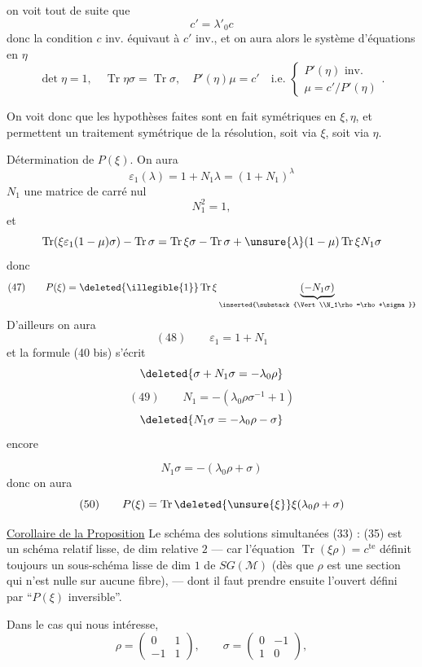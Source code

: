 
on voit tout de suite que
\[
c'=\lambda'_0c
\]
donc la condition $c$ inv. équivaut à $c'$ inv.,
et on aura alors le système d'équations en $\eta$
\[
\det\eta=1,\quad
\operatorname{Tr}\eta\sigma=\operatorname{Tr}\sigma,\quad
P'(\eta)\mu=c'\quad\text{i.e. }
\left\{
\begin{gathered}
P'(\eta)\text{ inv.}\\
\mu=c'/P'(\eta)
\end{gathered}
\right.
.
\]

On voit donc que les hypothèses faites sont en fait symétriques en
$\xi,\eta$, et permettent un traitement symétrique de la résolution,
soit via $\xi$, soit via $\eta$.

Détermination de $P(\xi)$. On aura
\[
\varepsilon_1(\lambda)=1+N_1\lambda=(1+N_1)^\lambda
\]
$N_1$ une matrice de carré nul
\[
N_1^2=1,
\]
et
\[
\operatorname{Tr}(\xi\varepsilon_1(1-\mu)\sigma)-\operatorname{Tr}\sigma
=\operatorname{Tr}\xi\sigma-\operatorname{Tr}\sigma
+\unsure{\lambda}(1-\mu)\operatorname{Tr}\xi N_1\sigma
\]
donc
\[
(47)\qquad
P(\xi)=\deleted{\illegible{1}}\operatorname{Tr}\xi
\underbrace{(-N_1\sigma)}_{\inserted{\substack{\Vert\\N_1\rho=\rho+\sigma}}}
\]
D'ailleurs  on aura
\[
(48)\qquad \varepsilon_1=1+N_1
\]
et la formule (40 bis) s'écrit
\[
\deleted{\sigma+N_1\sigma=-\lambda_0\rho}
\]
\[
(49)\qquad N_1=-(\lambda_0\rho\sigma^{-1}+1)
\]
\[
\deleted{N_1\sigma=-\lambda_0\rho-\sigma}
\]
  encore


\[
N_1\sigma=-(\lambda_0\rho+\sigma)
\]
donc on aura
\[
(50)\qquad
P(\xi)=\operatorname{Tr}\deleted{\unsure{\xi}}\xi(\lambda_0\rho+\sigma)
\]

\uline{Corollaire de la Proposition} Le schéma des solutions
 simultanées (33) : (35)
 est un schéma relatif lisse,
de dim relative $2$ --- car l'équation $\operatorname{Tr}(\xi\rho)=c^{\mathrm{te}}$
définit toujours un sous-schéma lisse de dim $1$
de  $SG(\mathcal{M})$
(dès que $\rho$ est une section qui n'est nulle sur aucune fibre),
--- dont il faut prendre ensuite l'ouvert défini par
“$P(\xi)$ inversible”.

Dans le cas qui nous intéresse,
\[
\rho=\begin{pmatrix}0&1\\-1&1\end{pmatrix},\qquad
\sigma=\begin{pmatrix}0&-1\\1&0\end{pmatrix},
\]

